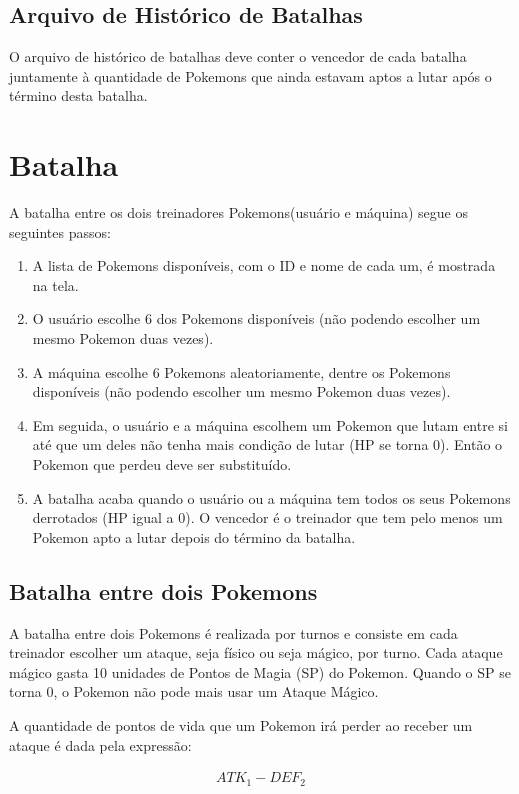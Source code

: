 \documentclass[12pt]{article}
\begin{document}
\subsection{Arquivo de Histórico de Batalhas}
O arquivo de histórico de batalhas deve conter o vencedor de cada batalha juntamente à quantidade de Pokemons que ainda estavam aptos a lutar após o término desta batalha.

\section{Batalha}
A batalha entre os dois treinadores Pokemons(usuário e máquina) segue os seguintes passos:

\begin{enumerate}
	\item A lista de Pokemons disponíveis, com o ID e nome de cada um, é mostrada na tela.
	\item O usuário escolhe 6 dos Pokemons disponíveis (não podendo escolher um mesmo Pokemon duas vezes).
	\item A máquina escolhe 6 Pokemons aleatoriamente, dentre os Pokemons disponíveis (não podendo escolher um mesmo Pokemon duas vezes).
	\item Em seguida, o usuário e a máquina escolhem um Pokemon que lutam entre si até que um deles não tenha mais condição de lutar (HP se torna 0). Então o Pokemon que perdeu deve ser substituído.
	\item A batalha acaba quando o usuário ou a máquina tem todos os seus Pokemons derrotados (HP igual a 0). O vencedor é o treinador que tem pelo menos um Pokemon apto a lutar depois do término da batalha.
\end{enumerate}
	
	
\subsection{Batalha entre dois Pokemons}
A batalha entre dois Pokemons é realizada por turnos e consiste em cada treinador escolher um ataque, seja físico ou seja mágico, por turno. Cada ataque mágico gasta 10 unidades de Pontos de Magia (SP) do Pokemon. Quando o SP se torna 0, o Pokemon não pode mais usar um Ataque Mágico.
	
A quantidade de pontos de vida que um Pokemon irá perder ao receber um ataque é dada pela expressão:

\begin{eqnarray}
	ATK_1 - DEF_2
\end{eqnarray}
\end{document}
